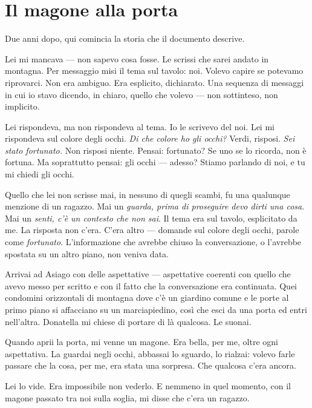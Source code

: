 \documentclass[
    oneside,                 %
    openany,                 %
    titlepage,
    11pt,
    a4paper,
    italian,
    DIV=14,                  %
    headinclude,
    footinclude=true,
    cleardoublepage=empty
]{scrbook}
\theoremstyle{ctplain}
\theoremstyle{ctdef}
\theoremstyle{ctrem}
\begin{document}
\chapter{Il magone alla porta}

Due anni dopo, qui comincia la storia che il documento descrive.

Lei mi mancava --- non sapevo cosa fosse. Le scrissi che sarei andato in montagna. Per messaggio misi il tema sul tavolo: noi. Volevo capire se potevamo riprovarci. Non era ambiguo. Era esplicito, dichiarato. Una sequenza di messaggi in cui io stavo dicendo, in chiaro, quello che volevo --- non sottinteso, non implicito.

Lei rispondeva, ma non rispondeva al tema. Io le scrivevo del noi. Lei mi rispondeva sul colore degli occhi. \emph{Di che colore ho gli occhi?} Verdi, risposi. \emph{Sei stato fortunato.} Non risposi niente. Pensai: fortunato? Se uno se lo ricorda, non è fortuna. Ma soprattutto pensai: gli occhi --- adesso? Stiamo parlando di noi, e tu mi chiedi gli occhi.

Quello che lei non scrisse mai, in nessuno di quegli scambi, fu una qualunque menzione di un ragazzo. Mai un \emph{guarda, prima di proseguire devo dirti una cosa}. Mai un \emph{senti, c'è un contesto che non sai}. Il tema era sul tavolo, esplicitato da me. La risposta non c'era. C'era altro --- domande sul colore degli occhi, parole come \emph{fortunato}. L'informazione che avrebbe chiuso la conversazione, o l'avrebbe spostata su un altro piano, non veniva data.

Arrivai ad Asiago con delle aspettative --- aspettative coerenti con quello che avevo messo per scritto e con il fatto che la conversazione era continuata. Quei condomini orizzontali di montagna dove c'è un giardino comune e le porte al primo piano si affacciano su un marciapiedino, così che esci da una porta ed entri nell'altra. Donatella mi chiese di portare di là qualcosa. Le suonai.

Quando aprii la porta, mi venne un magone. Era bella, per me, oltre ogni aspettativa. La guardai negli occhi, abbassai lo sguardo, lo rialzai: volevo farle passare che la cosa, per me, era stata una sorpresa. Che qualcosa c'era ancora.

Lei lo vide. Era impossibile non vederlo. E nemmeno in quel momento, con il magone passato tra noi sulla soglia, mi disse che c'era un ragazzo.
\end{document}
